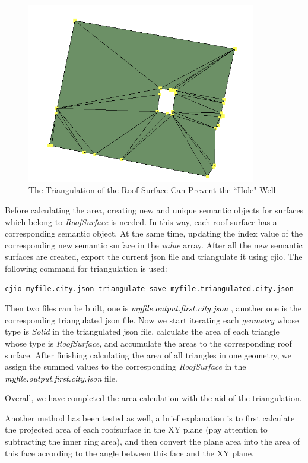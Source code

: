 \documentclass[12pt]{article}
\begin{document}
\begin{figure}[h] %
\centering
\includegraphics[width=10cm]{roofArea.png}
\caption{The Triangulation of the Roof Surface Can Prevent the ``Hole" Well}
\end{figure}

Before calculating the area, creating new and unique semantic objects for surfaces which belong to \textit{RoofSurface} is needed. In this way, each roof surface has a corresponding semantic object. At the same time, updating the index value of the corresponding new semantic surface in the \textit{value} array.
After all the new semantic surfaces are created, export the current json file and triangulate it using cjio. The following command for triangulation is used:

\texttt{cjio myfile.city.json triangulate save myfile.triangulated.city.json}

Then two files can be built, one is \textcolor{black}{\textit{myfile.output.first.city.json
}}, another one is the corresponding triangulated json file. Now we start iterating each \textit{geometry} whose type is \textit{Solid} in the triangulated json file, calculate the area of each triangle whose type is \textit{RoofSurface}, and accumulate the areas to the corresponding roof surface. After finishing calculating the area of all triangles in one geometry, we assign the summed values to the corresponding \textit{RoofSurface} in the \textcolor{black}{\textit{myfile.output.first.city.json}} file. 

Overall, we have completed the area calculation with the aid of the triangulation.

Another method has been tested as well, a brief explanation is to first calculate the projected area of each roofsurface in the XY plane (pay attention to subtracting the inner ring area), and then convert the plane area into the area of this face according to the angle between this face and the XY plane.
\end{document}
